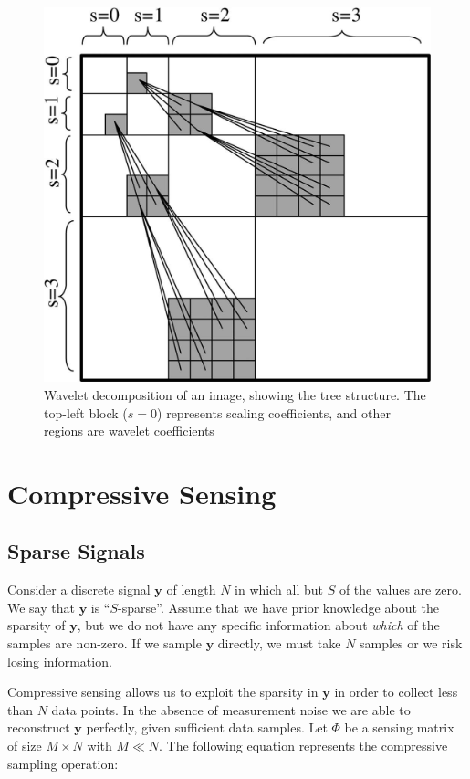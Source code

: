 \documentclass{IEEEtran}
\newcommand{\bfy}{\mathbf{y}}
\begin{document}
\begin{figure}
  \centering
  \includegraphics{wavelet_tree}
  \caption{Wavelet decomposition of an image, showing the tree structure. The top-left block
($s = 0$) represents scaling coefficients, and other regions are wavelet coefficients}
\label{fig:tree}
\end{figure}

\section{Compressive Sensing}

\subsection{Sparse Signals}
Consider a discrete signal $\bfy$ of length $N$ in which all but $S$ of the values are zero. We say that $\bfy$ is ``$S$-sparse''.  Assume that we have prior knowledge about the sparsity of $\bfy$, but we do not have any specific information about \emph{which} of the samples are non-zero. If we sample $\bfy$ directly, we must take $N$ samples or we risk losing information.

Compressive sensing allows us to exploit the sparsity in $\bfy$ in order to collect less than $N$ data points.  In the absence of measurement noise we are able to reconstruct $\bfy$ perfectly, given sufficient data samples. Let $\Phi$ be a sensing matrix of size $M \times N$ with $M \ll N$. The following equation represents the compressive sampling operation:
\end{document}
